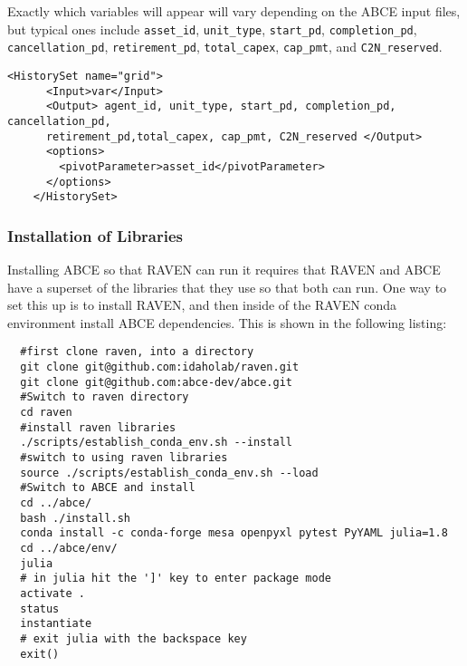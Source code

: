 Exactly which variables will appear will vary depending on the
ABCE input files, but typical ones include \texttt{asset\_id},
\texttt{unit\_type}, \texttt{start\_pd}, \texttt{completion\_pd},
\texttt{cancellation\_pd}, \texttt{retirement\_pd},
\texttt{total\_capex}, \texttt{cap\_pmt}, and
\texttt{C2N\_reserved}.


\begin{lstlisting}[style=XML]
    <HistorySet name="grid">
      <Input>var</Input>
      <Output> agent_id, unit_type, start_pd, completion_pd, cancellation_pd, 
      retirement_pd,total_capex, cap_pmt, C2N_reserved </Output>
      <options>
        <pivotParameter>asset_id</pivotParameter>
      </options>
    </HistorySet>
\end{lstlisting}


\subsubsection{Installation of Libraries}

Installing ABCE so that RAVEN can run it requires that RAVEN and
ABCE have a superset of the libraries that they use so that both
can run.  One way to set this up is to install RAVEN, and then 
inside of the RAVEN conda environment install ABCE dependencies.
This is shown in the following listing:

\begin{lstlisting}
  #first clone raven, into a directory
  git clone git@github.com:idaholab/raven.git
  git clone git@github.com:abce-dev/abce.git
  #Switch to raven directory
  cd raven
  #install raven libraries
  ./scripts/establish_conda_env.sh --install
  #switch to using raven libraries
  source ./scripts/establish_conda_env.sh --load
  #Switch to ABCE and install
  cd ../abce/
  bash ./install.sh
  conda install -c conda-forge mesa openpyxl pytest PyYAML julia=1.8
  cd ../abce/env/
  julia
  # in julia hit the ']' key to enter package mode
  activate .
  status
  instantiate
  # exit julia with the backspace key
  exit()
\end{lstlisting}


